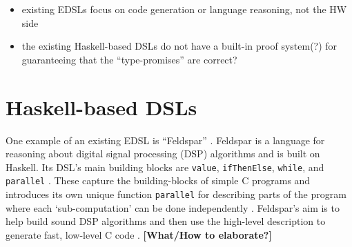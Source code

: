 \begin{itemize}
    \item existing EDSLs focus on code generation or language reasoning, not the
          HW side
    \item the existing Haskell-based DSLs do not have a built-in proof system(?)
          for guaranteeing that the ``type-promises'' are correct?
\end{itemize}

\section{Haskell-based DSLs}
	One example of an existing EDSL is ``Feldspar'' \cite{5558637}. Feldspar is a language for reasoning about digital signal processing (DSP) algorithms and is built on Haskell. Its DSL's main building blocks are \texttt{value}, \texttt{ifThenElse}, \texttt{while}, and \texttt{parallel} \cite{5558637}. These capture the building-blocks of simple C programs and introduces its own unique function \texttt{parallel} for describing parts of the program where each `sub-computation' can be done independently \cite{5558637}. Feldspar's aim is to help build sound DSP algorithms and then use the high-level description to generate fast, low-level C code \cite{5558637}. \textbf{[What/How to elaborate?]}
    \\\par
	
